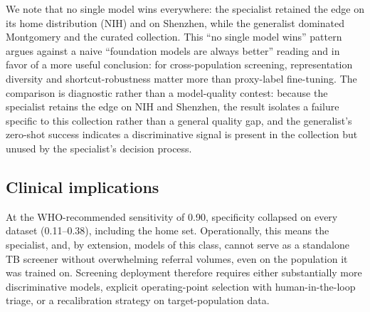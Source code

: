 \documentclass[runningheads]{llncs}
\begin{document}
We note that no single model wins everywhere: the specialist retained the edge on its home distribution (NIH) and on Shenzhen, while the generalist dominated Montgomery and the curated collection. This ``no single model wins'' pattern argues against a naive ``foundation models are always better'' reading and in favor of a more useful conclusion: for cross-population screening, representation diversity and shortcut-robustness matter more than proxy-label fine-tuning. The comparison is diagnostic rather than a model-quality contest: because the specialist retains the edge on NIH and Shenzhen, the result isolates a failure specific to this collection rather than a general quality gap, and the generalist's zero-shot success indicates a discriminative signal is present in the collection but unused by the specialist's decision process.

\subsection{Clinical implications}
At the WHO-recommended sensitivity of 0.90, specificity collapsed on every dataset (0.11--0.38), including the home set. Operationally, this means the specialist, and, by extension, models of this class, cannot serve as a standalone TB screener without overwhelming referral volumes, even on the population it was trained on. Screening deployment therefore requires either substantially more discriminative models, explicit operating-point selection with human-in-the-loop triage, or a recalibration strategy on target-population data.
\end{document}

